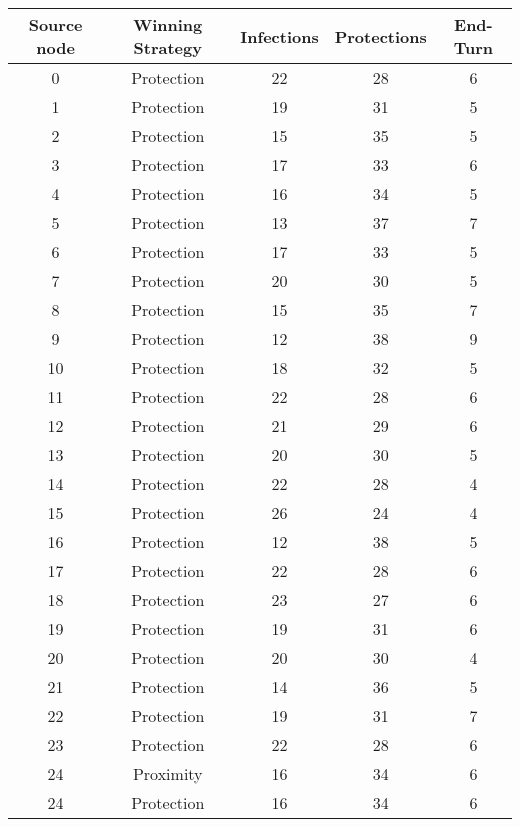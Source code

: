 \documentclass[results.tex]{subfiles}
\begin{document}
\begin{center}
  \begin{tabular}{| c || c | c | c | c |}
    \hline
    {\bfseries Source node} & {\bfseries Winning Strategy} & {\bfseries Infections} & {\bfseries Protections} & {\bfseries End-Turn} \\  %
    \hline\hline
    0 & Protection & 22 & 28 & 6 \\ 
    \hline
    1 & Protection & 19 & 31 & 5 \\ 
    \hline
    2 & Protection & 15 & 35 & 5 \\ 
    \hline
    3 & Protection & 17 & 33 & 6 \\ 
    \hline
    4 & Protection & 16 & 34 & 5 \\ 
    \hline
    5 & Protection & 13 & 37 & 7 \\ 
    \hline
    6 & Protection & 17 & 33 & 5 \\ 
    \hline
    7 & Protection & 20 & 30 & 5 \\ 
    \hline
    8 & Protection & 15 & 35 & 7 \\ 
    \hline
    9 & Protection & 12 & 38 & 9 \\ 
    \hline
    10 & Protection & 18 & 32 & 5 \\ 
    \hline
    11 & Protection & 22 & 28 & 6 \\ 
    \hline
    12 & Protection & 21 & 29 & 6 \\ 
    \hline
    13 & Protection & 20 & 30 & 5 \\ 
    \hline
    14 & Protection & 22 & 28 & 4 \\ 
    \hline
    15 & Protection & 26 & 24 & 4 \\ 
    \hline
    16 & Protection & 12 & 38 & 5 \\ 
    \hline
    17 & Protection & 22 & 28 & 6 \\ 
    \hline
    18 & Protection & 23 & 27 & 6 \\ 
    \hline
    19 & Protection & 19 & 31 & 6 \\ 
    \hline
    20 & Protection & 20 & 30 & 4 \\ 
    \hline
    21 & Protection & 14 & 36 & 5 \\ 
    \hline
    22 & Protection & 19 & 31 & 7 \\ 
    \hline
    23 & Protection & 22 & 28 & 6 \\ 
    \hline
    24 & Proximity & 16 & 34 & 6 \\ 
    \hline
    24 & Protection & 16 & 34 & 6 \\ 

\end{tabular}
\end{center}
\end{document}
